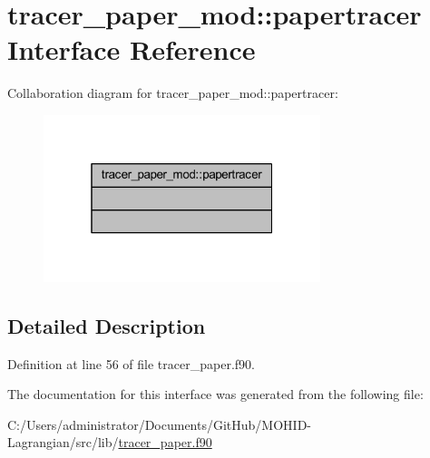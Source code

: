 \hypertarget{interfacetracer__paper__mod_1_1papertracer}{}\section{tracer\+\_\+paper\+\_\+mod\+:\+:papertracer Interface Reference}
\label{interfacetracer__paper__mod_1_1papertracer}


Collaboration diagram for tracer\+\_\+paper\+\_\+mod\+:\+:papertracer\+:
\nopagebreak
\begin{figure}[H]
\begin{center}
\leavevmode
\includegraphics[width=229pt]{interfacetracer__paper__mod_1_1papertracer__coll__graph}
\end{center}
\end{figure}


\subsection{Detailed Description}


Definition at line 56 of file tracer\+\_\+paper.\+f90.



The documentation for this interface was generated from the following file\+:\begin{DoxyCompactItemize}
\item 
C\+:/\+Users/administrator/\+Documents/\+Git\+Hub/\+M\+O\+H\+I\+D-\/\+Lagrangian/src/lib/\mbox{\hyperlink{tracer__paper_8f90}{tracer\+\_\+paper.\+f90}}\end{DoxyCompactItemize}
